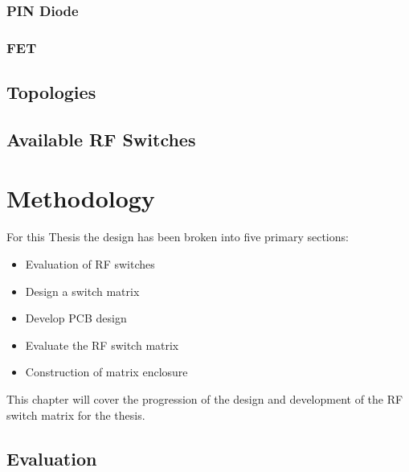 \documentclass[12pt,openany,a4paper]{book}
\begin{document}
\subsection{PIN Diode}


\subsection{FET}

\section{Topologies}



\section{Available RF Switches}

 






\chapter{Methodology}
For this Thesis the design has been broken into five primary sections:\\[-0.8cm]
\begin{itemize}
	\setlength\itemsep{-0.5em}
	\item Evaluation of RF switches
	\item Design a switch matrix
	\item Develop PCB design
	\item Evaluate the RF switch matrix
	\item Construction of matrix enclosure
\end{itemize}
This chapter will cover the progression of the design and development of the RF switch matrix for the thesis.




\section{Evaluation}
\end{document}

